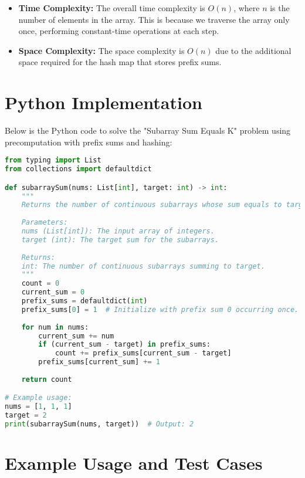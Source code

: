 \begin{itemize}
    \item \textbf{Time Complexity:} The overall time complexity is \(O(n)\), where \(n\) is the number of elements in the array. This is because we traverse the array only once, performing constant-time operations at each step.
    
    \item \textbf{Space Complexity:} The space complexity is \(O(n)\) due to the additional space required for the hash map that stores prefix sums.
\end{itemize}

\section*{Python Implementation}

Below is the Python code to solve the "Subarray Sum Equals K" problem using precomputation with prefix sums and hashing:

\begin{fullwidth}
\begin{lstlisting}[language=Python]
from typing import List
from collections import defaultdict

def subarraySum(nums: List[int], target: int) -> int:
    """
    Returns the number of continuous subarrays whose sum equals to target.
    
    Parameters:
    nums (List[int]): The input array of integers.
    target (int): The target sum for the subarrays.
    
    Returns:
    int: The number of continuous subarrays summing to target.
    """
    count = 0
    current_sum = 0
    prefix_sums = defaultdict(int)
    prefix_sums[0] = 1  # Initialize with prefix sum 0 occurring once.
    
    for num in nums:
        current_sum += num
        if (current_sum - target) in prefix_sums:
            count += prefix_sums[current_sum - target]
        prefix_sums[current_sum] += 1
    
    return count

# Example usage:
nums = [1, 1, 1]
target = 2
print(subarraySum(nums, target))  # Output: 2
\end{lstlisting}
\end{fullwidth}

\section*{Example Usage and Test Cases}

